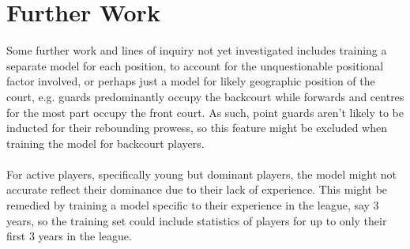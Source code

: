 \documentclass[paper=a4, fontsize=11pt]{scrartcl} %
\numberwithin{equation}{section} %
\numberwithin{figure}{section} %
\numberwithin{table}{section} %
\begin{document}
\section{Further Work}

Some further work and lines of inquiry not yet investigated includes training a separate model for each position, to account for the unquestionable positional factor involved, or perhaps just a model for likely geographic position of the court, e.g. guards predominantly occupy the backcourt while forwards and centres for the most part occupy the front court. As such, point guards aren't likely to be inducted for their rebounding prowess, so this feature might be excluded when training the model for backcourt players.\\
\\
For active players, specifically young but dominant players, the model might not accurate reflect their dominance due to their lack of experience. This might be remedied by training a model specific to their experience in the league, say 3 years, so the training set could include statistics of players for up to only their first 3 years in the league.    
\end{document}
